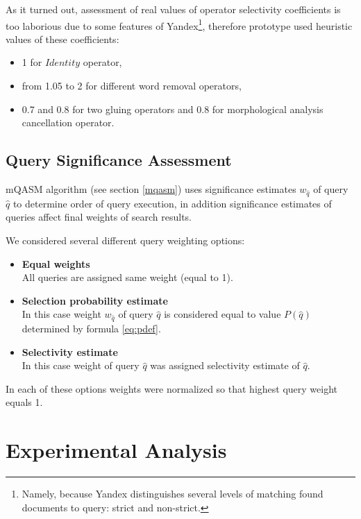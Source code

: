 \documentclass{article}
\begin{document}
As it turned out, assessment of real values of operator selectivity
coefficients is too laborious due to some features of Yandex\footnote{
Namely, because
Yandex distinguishes several levels of matching found documents to query:
strict and non-strict.
},
therefore prototype used heuristic values of these coefficients:
\begin{itemize}
\item 1 for $Identity$ operator,
\item from 1.05 to 2 for different word removal operators,
\item 0.7 and 0.8 for two gluing operators and 0.8 for morphological analysis cancellation operator.
\end{itemize}

\subsection{Query Significance Assessment} \label{queryweights}

mQASM algorithm (see section \ref{mqasm})
uses significance estimates $w_{\hat{q}}$ of query $\hat{q}$
to determine order of query execution,
in addition significance estimates of queries affect final weights of search results.

We considered several different query weighting options:

\begin{itemize}
\item {\bf Equal weights}\\
All queries are assigned same weight (equal to 1).
\item {\bf Selection probability estimate}\\
In this case weight $w_{\hat{q}}$ of query $\hat{q}$ is considered equal to value
$P(\hat{q})$ determined by formula \ref{eq:pdef}.
\item {\bf Selectivity estimate}\\
In this case weight of query $\hat{q}$ was assigned selectivity estimate of $\hat{q}$.
\end{itemize}

In each of these options weights were normalized
so that highest query weight equals 1.

\section{Experimental Analysis}
\end{document}

